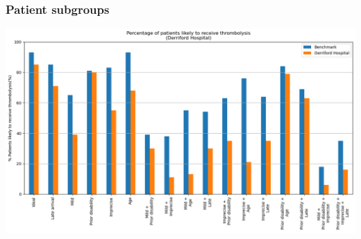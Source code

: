 \begin{frame}
\frametitle{Patient subgroups}

\begin{center}
\includegraphics[width=1.0\textwidth]{./images/plymouth_subgroups}
\end{center}

\end{frame}